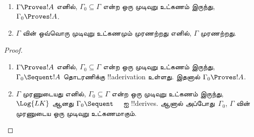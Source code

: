 \documentclass[../../../include/open-logic-section]{subfiles}
\begin{document}
\begin{prop}[இறுக்கத்தன்மை]
  \begin{enumerate}
  \item $\Gamma \Proves !A$ எனில், $\Gamma_0 \subseteq \Gamma$ என்ற ஒரு
    முடிவுறு உட்கணம் இருந்து, $\Gamma_0 \Proves !A$.
  \item $\Gamma$ வின் ஒவ்வொரு முடிவுறு உட்கணமும் முரணற்றது எனில்,
    $\Gamma$ முரணற்றது.
  \end{enumerate}
\end{prop}

\begin{proof}
  \begin{enumerate}
    \item $\Gamma \Proves !A$ எனில், $\Gamma_0 \subseteq \Gamma$ என்ற ஒரு
      முடிவுறு உட்கணம் இருந்து, $\Gamma_0 \Sequent !A$ தொடரணிக்கு
      !!a{derivation} உள்ளது. இதனால் $\Gamma_0 \Proves !A$.
    \item $\Gamma$ முரணுடையது எனில், $\Gamma_0 \subseteq \Gamma$ என்ற ஒரு
      முடிவுறு உட்கணம் இருந்து, $\Log{LK}$ ஆனது $\Gamma_0 \Sequent \quad$ ஐ
      !!{derive}s. ஆனால் அப்போது~$\Gamma_0$, $\Gamma$ வின் முரணுடைய ஒரு
      முடிவுறு உட்கணமாகும்.
  \end{enumerate}
\end{proof}
\end{document}
